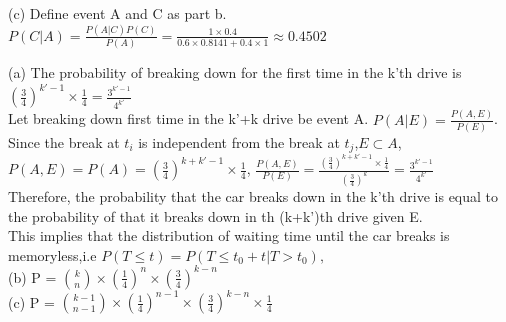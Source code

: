 \documentclass[12pt]{article}
\newenvironment{problem}[2][Problem]{\begin{trivlist}
\item[\hskip \labelsep {\bfseries #1}\hskip \labelsep {\bfseries #2.}]}{\end{trivlist}}
\begin{document}
(c) Define event A and C as part b.\\
$P(C|A) = \frac{P(A|C)P(C)}{P(A)} = \frac{1 \times 0.4}{0.6\times 0.8141 + 0.4 \times 1} \approx 0.4502$\\

\begin{problem}{3}
\end{problem}

 (a) The probability of breaking  down for the first time in the k'th drive is $(\frac{3}{4})^{k'-1}\times \frac{1}{4} = \frac{3^{k'-1}}{4^{k'}}$\\
Let breaking down first time in the k'+k drive be event A. $P(A|E) = \frac{P(A,E)}{P(E)}$.\\
Since the break at $t_i$ is independent from the break at $t_j$,$E \subset A $, $P(A,E) = P(A) = (\frac{3}{4})^{k+k'-1}\times \frac{1}{4}$, $\frac{P(A,E)}{P(E)} = \frac{(\frac{3}{4})^{k+k'-1}\times \frac{1}{4}}{(\frac{3}{4})^{k} } = \frac{3^{k'-1}}{4^{k'}}$\\
Therefore, the probability that the car breaks down in the k'th drive is equal to the probability of that it breaks down in th (k+k')th drive given E.\\
This implies that the distribution of waiting time until the car breaks is memoryless,i.e $P (T \leq t) = P (T \leq t_0 + t| T > t_0), $\\


(b) P = ${k \choose n } \times (\frac{1}{4})^{n} \times (\frac{3}{4})^{k-n} $\\

(c) P =  ${k-1 \choose n-1} \times (\frac{1}{4})^{n-1} \times (\frac{3}{4})^{k-n} \times \frac{1}{4}$\\
\end{document}
